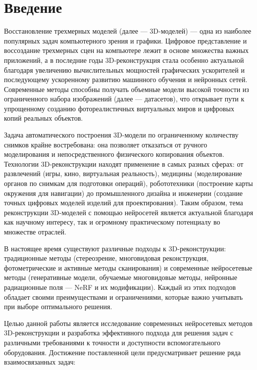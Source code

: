 \chapter{Введение}

Восстановление трехмерных моделей (далее — 3D-моделей) — одна из наиболее
популярных задач компьютерного зрения и графики. Цифровое представление и
воссоздание трехмерных сцен на компьютере лежит в основе множества важных
приложений, а в последние годы 3D-реконструкция стала особенно актуальной
благодаря увеличению вычислительных мощностей графических ускорителей и
последующему ускоренному развитию машинного обучения и нейронных сетей.
Современные методы способны получать объемные модели высокой точности из
ограниченного набора изображений (далее — датасетов), что открывает пути к
упрощенному созданию фотореалистичных виртуальных миров и цифровых копий
реальных объектов.

Задача автоматического построения 3D-модели по ограниченному количеству снимков
крайне востребована: она позволяет отказаться от ручного моделирования и
непосредственного физического копирования объектов. Технологии 3D-реконструкции
находят применение в самых разных сферах: от развлечений (игры, кино,
виртуальная реальность), медицины (моделирование органов по снимкам для
подготовки операций), робототехники (построение карты окружения для навигации)
до промышленного дизайна и инженерии (создание точных цифровых моделей изделий
для проектирования). Таким образом, тема реконструкции 3D-моделей с помощью
нейросетей является актуальной благодаря как научному интересу, так и огромному
практическому потенциалу во множестве отраслей.

В настоящее время существуют различные подходы к 3D-реконструкции: традиционные
методы (стереозрение, многовидовая реконструкция, фотометрические и активные
методы сканирования) и современные нейросетевые методы (генеративные модели,
обучаемые многовидовые методы, нейронные радиационные поля — NeRF и их
модификации). Каждый из этих подходов обладает своими преимуществами и
ограничениями, которые важно учитывать при выборе оптимального решения.

Целью данной работы является исследование современных нейросетевых методов
3D-реконструкции и разработка эффективного подхода для решения задач
с различными требованиями к точности и доступности вспомогательного
оборудования. Достижение поставленной цели предусматривает решение ряда
взаимосвязанных задач:

